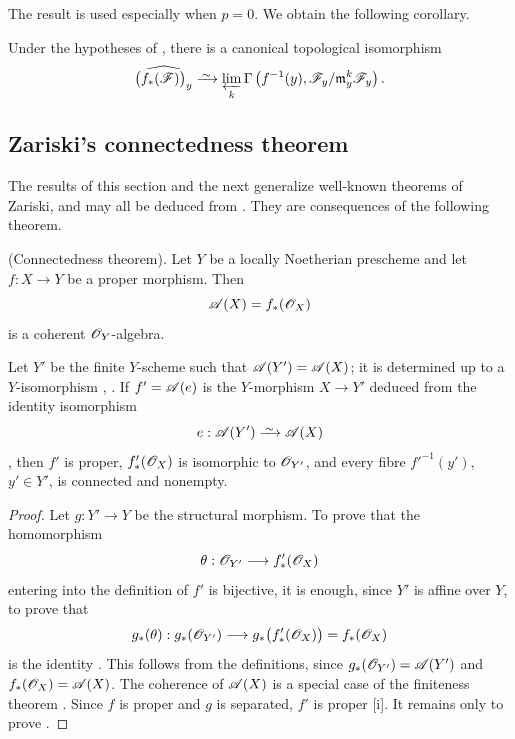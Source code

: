 \begin{env}[4.2.3]
\label{III.4.2.3}
The result  is used especially when $p=0$.
We obtain the following corollary.
\end{env}

\begin{corollary}[4.2.4]
\label{III.4.2.4}
Under the hypotheses of , there is a canonical
topological isomorphism
\[
  \widehat{\bigl(f_*(\sh{F})\bigr)_y}
  \isoto
  \varprojlim_k
  \Gamma\left(
    f^{-1}(y),
    \sh{F}_y/\mathfrak{m}_y^k\sh{F}_y
  \right).
\]
\end{corollary}


\subsection{Zariski's connectedness theorem}
\label{subsection:III.4.3}
\label{III.4.3}

The results of this section and the next generalize well-known
theorems of Zariski, and may all be deduced from
.  They are consequences of the following theorem.

\begin{theorem}[4.3.1]
\label{III.4.3.1}
\textnormal{(Connectedness theorem).}
Let $Y$ be a locally Noetherian prescheme and let $f:X\to Y$ be a
proper morphism.  Then
\[
  \mathscr{A}(X)=f_*(\mathscr{O}_X)
\]
is a coherent $\mathscr{O}_Y$-algebra.


Let $Y'$ be the finite $Y$-scheme such that
$\mathscr{A}(Y')=\mathscr{A}(X)$; it is determined up to a $Y$-isomorphism
, .
If $f'=\mathscr{A}(e)$ is the $Y$-morphism $X\to Y'$ deduced from the
identity isomorphism
\[
  e:\sh{A}(Y')\isoto\sh{A}(X)
\]
, then $f'$ is proper,
$f'_*(\mathscr{O}_X)$ is isomorphic to $\mathscr{O}_{Y'}$, and every fibre
$f'^{-1}(y')$, $y'\in Y'$, is connected and nonempty.
\end{theorem}

\begin{proof}
Let $g:Y'\to Y$ be the structural morphism.  To prove that the
homomorphism
\[
  \theta:\mathscr{O}_{Y'}\longrightarrow f'_*(\mathscr{O}_X)
\]
entering into the definition of $f'$ is bijective, it is enough,
since $Y'$ is affine over $Y$, to prove that
\[
  g_*(\theta):
  g_*(\mathscr{O}_{Y'})
  \longrightarrow
  g_*\bigl(f'_*(\mathscr{O}_X)\bigr)
  =
  f_*(\mathscr{O}_X)
\]
is the identity .  This follows from the
definitions, since
$g_*(\mathscr{O}_{Y'})=\mathscr{A}(Y')$ and
$f_*(\mathscr{O}_X)=\mathscr{A}(X)$.
The coherence of $\mathscr{A}(X)$ is a special case of the finiteness
theorem .  Since $f$ is proper and $g$ is separated,
$f'$ is proper [i].  It remains only to prove
.
\end{proof}

